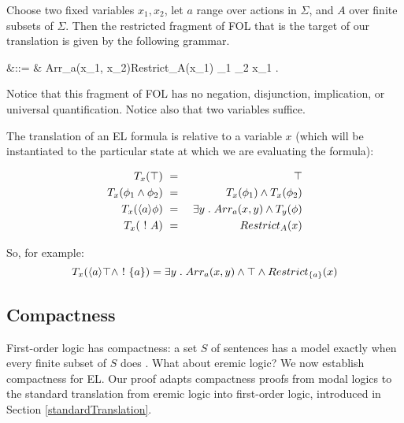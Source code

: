 \NI Choose two fixed variables $x_1, x_2$, let $a$ range over actions
in $\Sigma$, and $A$ over finite subsets of
$\Sigma$. Then the restricted fragment of FOL that is the target
of our translation is given by the following grammar.

\begin{GRAMMAR}
  \phi 
     &\quad ::= \quad&
  \top \fOr Arr_{a}(x_1, x_2)\fOr Restrict_A(x_1) \fOr \phi_1 \AND \phi_2 \fOr \exists x_1 . \phi 
\end{GRAMMAR}

\NI Notice that this fragment of FOL has no negation, disjunction,
implication, or universal quantification. Notice also that two
variables suffice.

The translation of an EL formula is relative to a variable $x$ (which
will be instantiated to the particular state at which we are
evaluating the formula):

\begin{eqnarray*}
  T_x(\top) & \ = \ & \top  \\
  T_x(\phi_1 \land \phi_2) & \ = \ & T_x(\phi_1) \land T_x(\phi_2)  \\
  T_x(\langle a \rangle \phi) & \ = \ & \exists y \; . \; Arr_a(x,y) \land T_y(\phi)  \\
  T_x(\ ! \  A) & \ = \ & Restrict_A(x) 
\end{eqnarray*}

\NI So, for example:
\[
T_x(\langle a \rangle \top \land \ ! \  \{a\}) = \exists y \; . \; Arr_a(x,y) \land \top \land Restrict_{\{a\}}(x)
\]


\subsection{Compactness}

\NI First-order logic has compactness: a set $S$ of sentences has a
model exactly when every finite subset of $S$ does \cite[Chapter
  4.3]{EndertonHB:matinttl}. What about eremic logic?  We now
establish compactness for EL. Our proof adapts compactness proofs from
modal logics \cite{BlackburnP:modlog} to the standard translation from
eremic logic into first-order logic, introduced in Section
\ref{standardTranslation}.


